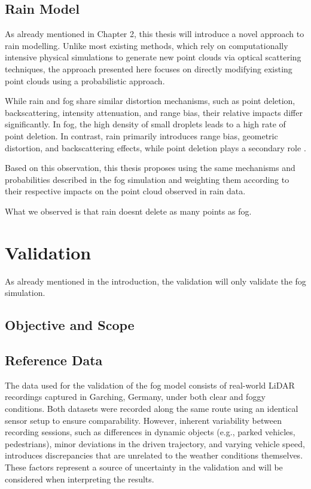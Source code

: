 
\subsection{Rain Model}

As already mentioned in Chapter 2, this thesis will introduce a novel approach to rain modelling. Unlike most existing methods, which rely on computationally intensive physical simulations to generate new point clouds via optical scattering techniques, the approach presented here focuses on directly modifying existing point clouds using a probabilistic approach. 

While rain and fog share similar distortion mechanisms, such as point deletion, backscattering, intensity attenuation, and range bias, their relative impacts differ significantly. 
In fog, the high density of small droplets leads to a high rate of point deletion. In contrast, rain primarily introduces range bias, geometric distortion, and backscattering effects, while point deletion plays a secondary role \cite{haider_methodology_2023}.

Based on this observation, this thesis proposes using the same mechanisms and probabilities described in the fog simulation and weighting them according to their respective impacts on the point cloud observed in rain data. 

What we observed is that rain doesnt delete as many points as fog. 




\section{Validation}

As already mentioned in the introduction, the validation will only validate the fog simulation. 
\subsection{Objective and Scope}

\subsection{Reference Data}

The data used for the validation of the fog model consists of real-world LiDAR recordings captured in Garching, Germany, under both clear and foggy conditions. Both datasets were recorded along the same route using an identical sensor setup to ensure comparability. However, inherent variability between recording sessions, such as differences in dynamic objects (e.g., parked vehicles, pedestrians), minor deviations in the driven trajectory, and varying vehicle speed, introduces discrepancies that are unrelated to the weather conditions themselves. These factors represent a source of uncertainty in the validation and will be considered when interpreting the results.

